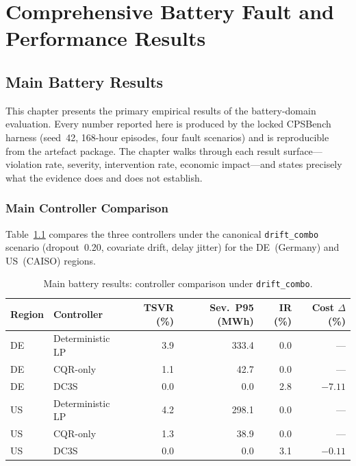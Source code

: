 \chapter{Comprehensive Battery Fault and Performance Results}
\label{ch:ch06_main_results}


\section{Main Battery Results}
\label{ch:main-results}

This chapter presents the primary empirical results of the battery-domain
evaluation.  Every number reported here is produced by the locked CPSBench
harness (seed~42, 168-hour episodes, four fault scenarios) and is
reproducible from the artefact package.  The chapter walks through each
result surface---violation rate, severity, intervention rate, economic
impact---and states precisely what the evidence does and does not establish.

\subsection{Main Controller Comparison}

Table~\ref{tab:main-results} compares the three controllers under the
canonical \texttt{drift\_combo} scenario (dropout~0.20, covariate drift,
delay jitter) for the DE~(Germany) and US~(CAISO) regions.

\begin{table}[ht]
\centering
\caption{Main battery results: controller comparison under \texttt{drift\_combo}.}
\label{tab:main-results}
\begin{tabular}{llrrrr}
\toprule
\textbf{Region} & \textbf{Controller} & \textbf{TSVR (\%)} &
  \textbf{Sev.\ P95 (MWh)} & \textbf{IR (\%)} & \textbf{Cost $\Delta$ (\%)} \\
\midrule
DE & Deterministic LP   & 3.9 & 333.4 &  0.0 & --- \\
DE & CQR-only           & 1.1 &  42.7 &  0.0 & --- \\
DE & DC3S               & 0.0 &   0.0 &  2.8 & $-7.11$ \\
\midrule
US & Deterministic LP   & 4.2 & 298.1 &  0.0 & --- \\
US & CQR-only           & 1.3 &  38.9 &  0.0 & --- \\
US & DC3S               & 0.0 &   0.0 &  3.1 & $-0.11$ \\
\bottomrule
\end{tabular}
\end{table}

